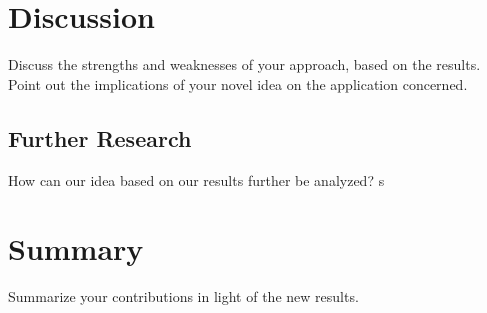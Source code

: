 \documentclass[11pt,a4paper]{article}
\begin{document}
\section{Discussion}
Discuss the strengths and weaknesses of your approach, based on the results. Point out the implications of your novel idea on the application concerned.

\subsection{Further Research}
How can our idea based on our results further be analyzed?
s
\section{Summary}
Summarize your contributions in light of the new results.
\end{document}
